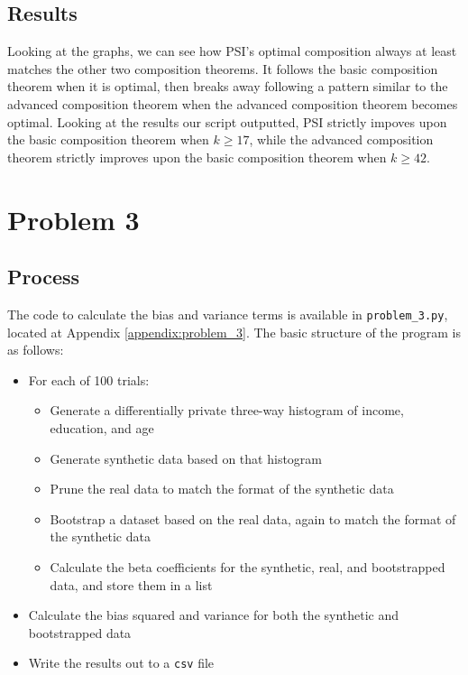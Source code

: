 \documentclass[12pt]{article}
\def\cl{\lstinline}
\begin{document}
\subsection{Results}

\noindent

Looking at the graphs, we can see how PSI's optimal composition always at least matches the other two composition theorems. It follows the basic composition theorem when it is optimal, then breaks away following a pattern similar to the advanced composition theorem when the advanced {}composition theorem becomes optimal. Looking at the results our script outputted, PSI strictly impoves upon the basic composition theorem when $k \geq 17$, while the advanced composition theorem strictly improves upon the basic composition theorem when $k \geq 42$.

\newpage

\section{Problem 3}

\subsection{Process}

\noindent

The code to calculate the bias and variance terms is available in \cl{problem_3.py}, located at Appendix \ref{appendix:problem_3}. The basic structure of the program is as follows:

\begin{itemize}
  \item For each of 100 trials:
  \begin{itemize}
    \item Generate a differentially private three-way histogram of income, education, and age
    \item Generate synthetic data based on that histogram
    \item Prune the real data to match the format of the synthetic data
    \item Bootstrap a dataset based on the real data, again to match the format of the synthetic data
    \item Calculate the beta coefficients for the synthetic, real, and bootstrapped data, and store them in a list
  \end{itemize}
  \item Calculate the bias squared and variance for both the synthetic and bootstrapped data
  \item Write the results out to a \cl{csv} file
\end{itemize}
\end{document}
